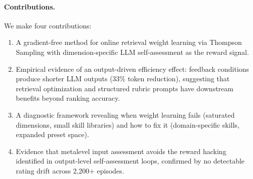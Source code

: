 \paragraph{Contributions.} We make four contributions:
\begin{enumerate}
\item A gradient-free method for online retrieval weight learning via Thompson Sampling with dimension-specific LLM self-assessment as the reward signal.
\item Empirical evidence of an output-driven efficiency effect: feedback conditions produce shorter LLM outputs (33\% token reduction), suggesting that retrieval optimization and structured rubric prompts have downstream benefits beyond ranking accuracy.
\item A diagnostic framework revealing when weight learning fails (saturated dimensions, small skill libraries) and how to fix it (domain-specific skills, expanded preset space).
\item Evidence that metalevel input assessment avoids the reward hacking identified in output-level self-assessment loops, confirmed by no detectable rating drift across 2{,}200+ episodes.
\end{enumerate}
